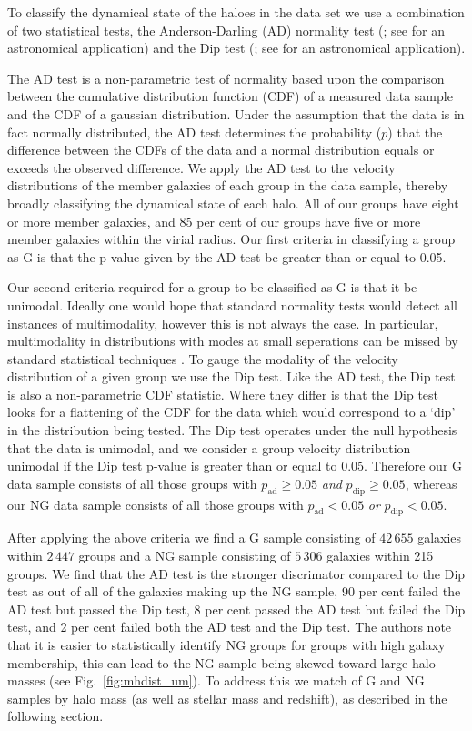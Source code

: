 \documentclass[a4paper,fleqn,usenatbib]{mnras}
\begin{document}
To classify the dynamical state of the haloes in the data set we use a
combination of two statistical tests, the Anderson-Darling (AD)
normality test (\citealt{anderson1952}; see \citealt{hou2009, hou2013}
for an astronomical application) and the Dip test
(\citealt{hartigan1985}; see \citealt{ribeiro2013} for an astronomical
application).
\par
The AD test is a non-parametric test of normality based
upon the comparison between the cumulative distribution function (CDF) of a
measured data sample and the CDF of a gaussian distribution.  Under
the assumption that the data is in fact normally distributed, the AD
test determines the probability ($p$) that the difference between
the CDFs of the data and a normal distribution equals or exceeds the
observed difference.  We apply the AD test to the velocity
distributions of the member galaxies of each group in the data sample,
thereby broadly classifying the dynamical state of each halo.  All of
our groups have eight or more member galaxies, and 85 per cent of our
groups have five or more member galaxies within the virial radius.  Our
first criteria in classifying a group as G is that the p-value given
by the AD test be greater than or equal to 0.05.
\par
Our second criteria required for a
group to be classified as G is that it be unimodal.  Ideally one would
hope that standard normality tests would detect all instances of
multimodality, however this is not always the case.  In particular,
multimodality in distributions with modes at small seperations
can be missed by standard statistical techniques \citep{ashman1994}. To
gauge the modality of the velocity distribution of a given group we
use the Dip test.  Like the AD test, the Dip test is also a
non-parametric CDF statistic.  Where they differ is that the Dip test
looks for a flattening of the CDF for the data which would correspond
to a `dip' in the distribution being tested.  The Dip test operates
under the null hypothesis that the data is unimodal, and we consider a
group velocity distribution unimodal if the Dip test p-value is
greater than or equal to 0.05.  Therefore our G data sample consists
of all those groups with $p_{\text{ad}} \ge 0.05$
\emph{and} $p_{\text{dip}} \ge 0.05$, whereas our NG data
sample consists of all those groups with $p_{\text{ad}} < 0.05$
\emph{or} $p_{\text{dip}} < 0.05$.
\par
After applying the above criteria we find a G sample consisting of
$42\,655$ galaxies within $2\,447$ groups and a NG sample consisting of $5\,306$
galaxies within 215 groups.  We find that the AD test is the stronger discrimator
compared to the Dip test as out of all of the galaxies making up the
NG sample, 90 per cent failed the AD test but passed the Dip test, 8
per cent passed the AD test but failed the Dip test, and 2 per cent
failed both the AD test and the Dip test.  The authors note that it is
easier to statistically identify NG groups for groups with high
galaxy membership, this can lead to the NG sample being skewed toward
large halo masses (see Fig.~\ref{fig:mhdist_um}).  To address this we
match of G and NG samples by halo mass (as well as stellar mass and
redshift), as described in the following section.
\end{document}
